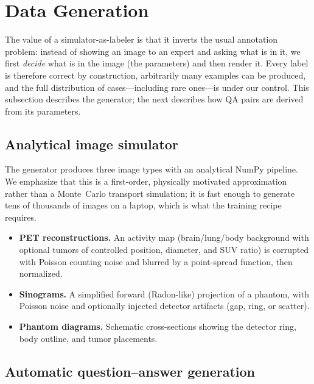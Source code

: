 \documentclass[11pt]{article}
\begin{document}
\section{Data Generation}
\label{sec:data}

The value of a simulator-as-labeler is that it inverts the usual annotation
problem: instead of showing an image to an expert and asking what is in it, we
first \emph{decide} what is in the image (the parameters) and then render it.
Every label is therefore correct by construction, arbitrarily many examples can
be produced, and the full distribution of cases---including rare ones---is under
our control. This subsection describes the generator; the next describes how QA
pairs are derived from its parameters.

\subsection{Analytical image simulator}

The generator produces three image types with an analytical NumPy pipeline. We
emphasize that this is a first-order, physically motivated approximation rather
than a Monte~Carlo transport simulation; it is fast enough to generate tens of
thousands of images on a laptop, which is what the training recipe requires.

\begin{itemize}[leftmargin=*]
    \item \textbf{PET reconstructions.} An activity map (brain/lung/body
    background with optional tumors of controlled position, diameter, and SUV
    ratio) is corrupted with Poisson counting noise and blurred by a
    point-spread function, then normalized.
    \item \textbf{Sinograms.} A simplified forward (Radon-like) projection of a
    phantom, with Poisson noise and optionally injected detector artifacts
    (gap, ring, or scatter).
    \item \textbf{Phantom diagrams.} Schematic cross-sections showing the
    detector ring, body outline, and tumor placements.
\end{itemize}

\subsection{Automatic question--answer generation}
\end{document}
